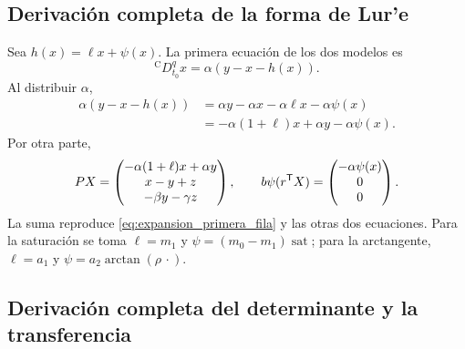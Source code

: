 \ifnum{}\relax
\subsection{Derivación completa de la forma de Lur'e}
\label{app:verificacion_lure}

Sea \(h(x)=\ell x+\psi(x)\). La primera ecuación de los dos modelos es
\[
{}^{\mathrm C}D_{t_0}^{q}x
=\alpha(y-x-h(x)).
\]
Al distribuir \(\alpha\),
\begin{align}
\alpha(y-x-h(x))
&=\alpha y-\alpha x-\alpha\ell x-\alpha\psi(x)\nonumber\\
&=-\alpha(1+\ell)x+\alpha y-\alpha\psi(x).
\label{eq:expansion_primera_fila}
\end{align}
Por otra parte,
\[
PX=
\begin{pmatrix}
-\alpha(1+\ell)x+\alpha y\\
x-y+z\\
-\beta y-\gamma z
\end{pmatrix},
\qquad
b\psi(r^{\mathsf T}X)=
\begin{pmatrix}
-\alpha\psi(x)\\0\\0
\end{pmatrix}.
\]
La suma reproduce \cref{eq:expansion_primera_fila} y las otras dos
ecuaciones. Para la saturación se toma
\(\ell=m_1\) y
\(\psi=(m_0-m_1)\operatorname{sat}\); para la arctangente,
\(\ell=a_1\) y \(\psi=a_2\arctan(\rho\,\cdot)\).

\fi
\ifnum{}\relax
\subsection{Derivación completa del determinante y la transferencia}
\label{app:transferencia_explicita}

